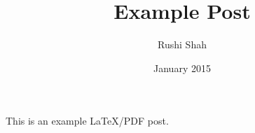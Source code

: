 \documentclass{article}
\author{Rushi Shah}
\date{January 2015}
\title{Example Post}
\begin{document}
\maketitle
This is an example LaTeX/PDF post.
\end{document}
